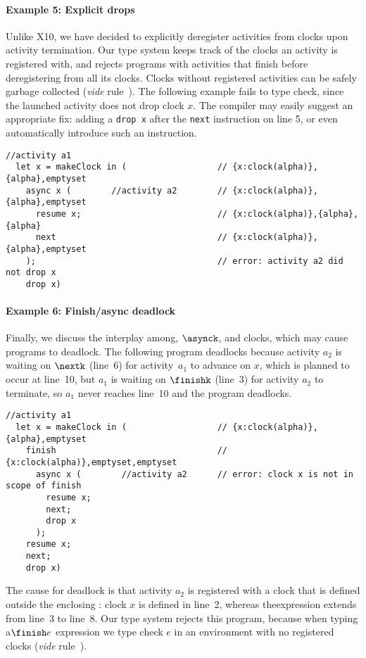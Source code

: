 \paragraph{Example 5: Explicit drops}

Unlike X10, we have decided to explicitly deregister activities from
clocks upon activity termination.
Our type system keeps track of the clocks an activity is registered
with, and rejects programs with activities that finish before
deregistering from all its clocks.
Clocks without registered activities can be safely garbage collected
(\textit{vide} rule~\Rdrop).
The following example fails to type check, since the launched
activity does not drop clock $x$.
The compiler may easily suggest an appropriate fix: adding a
\lstinline|drop x| after the \lstinline|next| instruction on line 5,
or even automatically introduce such an instruction.
\begin{lstlisting}[numbers=right]
  //activity a1
  let x = makeClock in (                  // {x:clock(alpha)},{alpha},emptyset
    async x (        //activity a2        // {x:clock(alpha)},{alpha},emptyset
      resume x;                           // {x:clock(alpha)},{alpha},{alpha}
      next                                // {x:clock(alpha)},{alpha},emptyset
    );                                    // error: activity a2 did not drop x 
    drop x)
\end{lstlisting}


\paragraph{Example 6: Finish/async deadlock}

Finally, we discuss the interplay among\finishk\!, $\asynck$, and
clocks, which may cause programs to deadlock. 
The following program deadlocks because activity $a_2$ is waiting on
$\nextk$ (line~6) for activity~$a_1$ to advance on $x$, which is
planned to occur at line~10, but $a_1$ is waiting on
$\finishk$ (line~3) for activity $a_2$ to terminate, so $a_1$ never
reaches line~10 and the program deadlocks.
\begin{lstlisting}[numbers=right]
  //activity a1
  let x = makeClock in (                  // {x:clock(alpha)},{alpha},emptyset
    finish                                // {x:clock(alpha)},emptyset,emptyset
      async x (        //activity a2      // error: clock x is not in scope of finish
        resume x; 
        next; 
        drop x
      ); 
    resume x;
    next;
    drop x)
\end{lstlisting}
The cause for deadlock is that activity $a_2$ is registered with a clock
that is defined outside the enclosing \finishk\!: clock $x$ is defined
in line~2, whereas the\finishk expression extends from line~3 to line~8.
Our type system rejects this program, because when typing a$\finish e$ expression we type check $e$ in an environment 
with no registered clocks (\textit{vide} rule~\Rfinish). 


